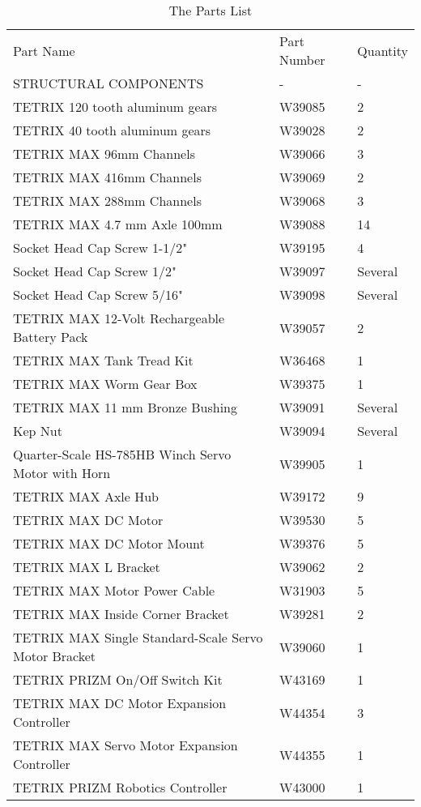 \documentclass[12pt]{article}
\begin{document}
\begin{table}[]
\caption{The Parts List}
\label{Parts List}
\begin{tabular}{lll}
\rowcolor[HTML]{6665CD} 
Part Name & Part Number & Quantity \\
\rowcolor[HTML]{FFCC67} 
STRUCTURAL COMPONENTS & - & - \\ \hline
TETRIX 120 tooth aluminum gears & W39085 & 2 \\
TETRIX 40 tooth aluminum gears & W39028 & 2 \\
TETRIX MAX 96mm Channels & W39066 & 3 \\
TETRIX MAX 416mm Channels & W39069 & 2 \\
TETRIX MAX 288mm Channels & W39068 & 3 \\
TETRIX MAX 4.7 mm Axle 100mm & W39088 & 14 \\
Socket Head Cap Screw 1-1/2" & W39195 & 4 \\
Socket Head Cap Screw 1/2" & W39097 & Several \\
Socket Head Cap Screw 5/16" & W39098 & Several \\
TETRIX MAX 12-Volt Rechargeable Battery Pack & W39057 & 2 \\
TETRIX MAX Tank Tread Kit & W36468 & 1 \\
TETRIX MAX Worm Gear Box & W39375 & 1 \\
TETRIX MAX 11 mm Bronze Bushing & W39091 & Several \\
Kep Nut & W39094 & Several \\
Quarter-Scale HS-785HB Winch Servo Motor with Horn & W39905 & 1 \\
TETRIX MAX Axle Hub & W39172 & 9 \\
TETRIX MAX DC Motor & W39530 & 5 \\
TETRIX MAX DC Motor Mount & W39376 & 5 \\
TETRIX MAX L Bracket & W39062 & 2 \\
TETRIX MAX Motor Power Cable & W31903 & 5 \\
TETRIX MAX Inside Corner Bracket & W39281 & 2 \\
TETRIX MAX Single Standard-Scale Servo Motor Bracket & W39060 & 1 \\
TETRIX PRIZM On/Off Switch Kit & W43169 & 1 \\
TETRIX MAX DC Motor Expansion Controller & W44354 & 3 \\
TETRIX MAX Servo Motor Expansion Controller & W44355 & 1 \\
TETRIX PRIZM Robotics Controller & W43000 & 1 \\

\end{tabular}
\end{table}
\end{document}

